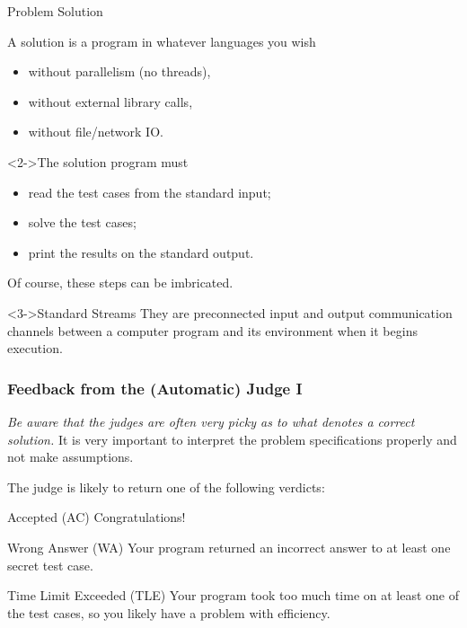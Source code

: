 \documentclass{beamer}
\begin{document}
\begin{frame}{Problem Solution}
  \begin{block}{A solution is a program in whatever languages you wish}
  \begin{itemize}
  \item without parallelism (no threads),
  \item without external library calls,
  \item without file/network IO.
  \end{itemize}  
  \end{block}

  \begin{block}<2->{The solution program must}
    \begin{itemize}
    \item read the test cases from the standard input;
    \item solve the test cases;
    \item print the results on the standard output.
    \end{itemize}
  Of course, these steps can be imbricated.    
\end{block}
   
  \begin{block}<3->{Standard Streams}
    They are preconnected input and output communication channels between a computer program and its environment when it begins execution.
  \end{block}
\end{frame}



\begin{frame}
  \frametitle{Feedback from the (Automatic) Judge I}
  \emph{Be aware that the judges are often very picky as to what denotes a correct solution.}
  It is very important to interpret the problem specifications properly and not make assumptions.

  The judge is likely to return one of the following verdicts:

  \begin{block}{Accepted (AC)}
    Congratulations! 
  \end{block}

  \begin{block}{Wrong Answer (WA)}
    Your program returned an incorrect answer to at least one secret test case.
  \end{block}

  \begin{block}{Time Limit Exceeded (TLE)}
    Your program took too much time on at least one of the test cases, so you likely have a problem with efficiency.
  \end{block}

\end{frame}
\end{document}
